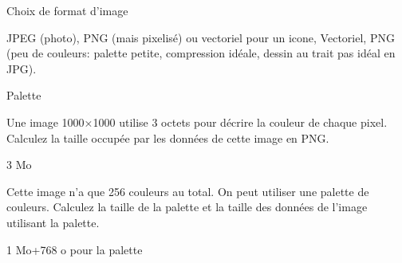 \begin{exercice}
\begin{exercicelet}{Choix de format d'image}
\begin{questions}
      \begin{xcorrection}
        JPEG (photo), PNG (mais pixelisé) ou vectoriel pour un icone,
        Vectoriel, PNG (peu de couleurs: palette petite, compression idéale,
        dessin au trait pas idéal en JPG).
      \end{xcorrection}
    \end{questions}
  \end{exercicelet}
  \begin{exercicelet}{Palette}
    \begin{questions}
    \item Une image 1000×1000 utilise 3 octets pour décrire la couleur de
      chaque pixel. Calculez la taille occupée par les données de cette image
      en PNG.
      \begin{xcorrection}
        3 Mo
      \end{xcorrection}
    \item Cette image n'a que 256 couleurs au total. On peut utiliser une
      palette de couleurs. Calculez la taille de la palette et la taille des
      données de l'image utilisant la palette.
      \begin{xcorrection}
        1 Mo+768 o pour la palette
      \end{xcorrection}
    \end{questions}
  \end{exercicelet}
\end{exercice}
